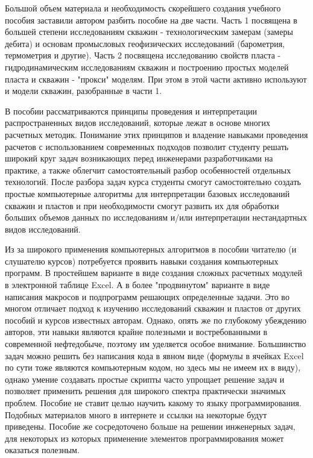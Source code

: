 \documentclass{memoir}
\begin{document}
Большой объем материала и необходимость скорейшего создания учебного пособия заставили автором разбить пособие на две части. Часть 1 посвящена в большей степени исследованиям скважин - технологическим замерам (замеры дебита) и основам промысловых геофизических исследований (барометрия, термометрия и другие).  Часть 2 посвящена исследованию свойств пласта - гидродинамическим исследованиям скважин и построению простых моделей пласта и скважин - "прокси" моделям. При этом в этой части активно используют и модели скважин, разобранные в части 1.

В пособии рассматриваются принципы проведения и интерпретации распространенных видов исследований, которые лежат в основе многих расчетных методик. Понимание этих принципов и владение навыками проведения расчетов с использованием современных подходов позволит студенту решать широкий круг задач возникающих перед инженерами разработчиками на практике, а также облегчит самостоятельный разбор особенностей отдельных технологий. После разбора задач курса студенты смогут самостоятельно создать простые компьютерные алгоритмы для интерпретации базовых исследований скважин и пластов и при необходимости смогут развить их для обработки больших объемов данных по исследованиям и/или интерпретации нестандартных видов исследований. 

Из за широкого применения компьютерных алгоритмов в пособии читателю (и слушателю курсов) потребуется проявить навыки создания компьютерных программ. В простейшем варианте в виде создания сложных расчетных модулей в электронной таблице Excel. А в более "продвинутом" варианте в виде написания макросов и подпрограмм решающих определенные задачи. Это во многом отличает подход к изучению исследований скважин и пластов от других пособий и курсов известных авторам. Однако, опять же по глубокому убеждению авторов, эти навыки являются крайне полезными и востребованными в современной нефтедобыче, поэтому им уделяется особое внимание. Большинство задач можно решить без написания кода в явном виде (формулы в ячейках Excel по сути тоже являются компьютерным кодом, но здесь мы не имеем их в виду), однако умение создавать простые скрипты часто упрощает решение задач и позволяет применить решения для широкого спектра практически значимых проблем. Пособие не ставит целью научить какому то языку программирования. Подобных материалов много в интернете и ссылки на некоторые будут приведены. Пособие же сосредоточено больше на решении инженерных задач, для некоторых из которых применение элементов программирования может оказаться полезным. 
\end{document}
